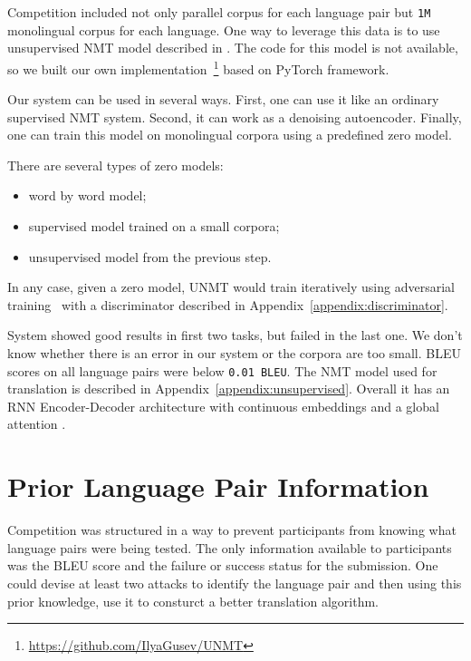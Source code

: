 \documentclass[]{article}
\begin{document}
Competition included not only parallel corpus for each language pair but  {\tt 1M} monolingual corpus for each language.
One way to leverage this data is to use unsupervised NMT model described in \cite{DBLP:journals/corr/abs-1711-00043}.
The code for this model is not available, so we built our own implementation~\footnote{\url{https://github.com/IlyaGusev/UNMT}} based on PyTorch framework. 

Our system can be used in several ways.
First, one can use it like an ordinary supervised NMT system.
Second, it can work as a denoising autoencoder.
Finally, one can train this model on monolingual corpora using a predefined zero model.

There are several types of zero models:
\begin{itemize}
\item word by word model;
\item supervised model trained on a small corpora;
\item unsupervised model from the previous step.
\end{itemize}

In any case, given a zero model, UNMT would train iteratively using adversarial training~\citep{goodfellow2016nips} with a discriminator described in Appendix~\ref{appendix:discriminator}.

System showed good results in first two tasks, but failed in the last one.
We don't know whether there is an error in our system or the corpora are too small.
BLEU scores on all language pairs were below {\tt 0.01 BLEU}.
The NMT model used for translation is described in Appendix~\ref{appendix:unsupervised}.
Overall it has an RNN Encoder-Decoder architecture \citep{DBLP:journals/corr/ChoMGBSB14} with continuous embeddings and a global attention \citep{luong2015effective}.

\section{Prior Language Pair Information}
\label{sect:nonoblivious}

Competition was structured in a way to prevent participants from knowing what language pairs were being tested.
The only information available to participants was the BLEU score and the failure or success status for the submission.
One could devise at least two attacks to identify the language pair and then using this prior knowledge, use it to consturct a better translation algorithm.
\end{document}
